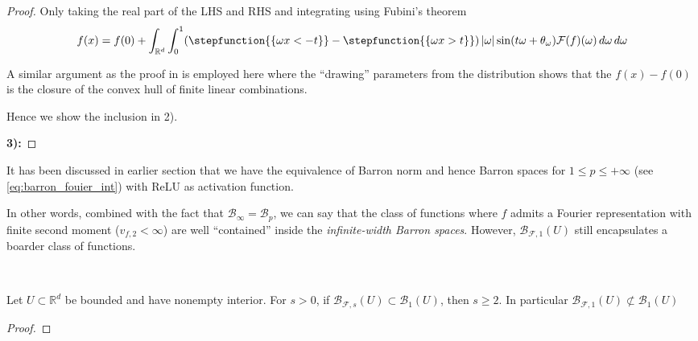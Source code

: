 \begin{proof}
Only taking the real part of the LHS and RHS and integrating using Fubini's theorem
\begin{equation}
    f(x) = f(0) + \int_{\R^d} \int_0^1 (
        \stepfunction{\{\omega x<-t\}} - \stepfunction{\{\omega x>t\}}
    ) \abs{\omega} \sin(t\omega + \theta_{\omega})
    \fourier{f}(\omega)\,d\omega\,d\omega
\end{equation}

A similar argument as the proof in  is employed here
where the ``drawing'' parameters from the distribution shows that the $f(x) -
f(0)$ is the closure of the convex hull of finite linear combinations.

Hence we show the inclusion in 2).

\textbf{3):} 

\end{proof}

\begin{remark}
    It has been discussed in earlier section that we have the equivalence of
    Barron norm and hence Barron spaces for $1 \leq p\leq +\infty$ (see
    \eqref{eq:barron_fouier_int}) with ReLU as activation function.

    In other words, combined with the fact that $\mathcal{B}_{\infty} =
        \mathcal{B}_p$, we can say that the class of functions where $f$ admits
        a Fourier representation with finite second moment ($v_{f, 2} < \infty$)
        are well ``contained'' inside the \textit{infinite-width Barron spaces}.
        However, $\mathcal{B}_{\mathcal{F}, 1}(U)$ still encapsulates a boarder
        class of functions.
\end{remark}


\begin{lemma}~\cite[Proposition 7.4]{carageaNeuralNetworkApproximation2022}

    Let $U \subset \mathbb{R}^d$ be bounded and have nonempty interior. For
    $s>0$, if $\mathcal{B}_{\mathcal{F},s}(U) \subset \mathcal{B}_{1}(U)$, then
    $s \geq 2$. In particular $\mathcal{B}_{\mathcal{F},1}(U) \not\subset
        \mathcal{B}_{1}(U)$
\end{lemma}

\begin{proof}

\end{proof}




